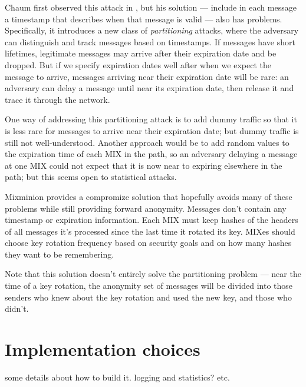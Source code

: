 \documentclass{llncs}
\begin{document}
Chaum first observed this attack in \cite{chaum-mix}, but his solution
--- include in each message a timestamp that describes when that message
is valid --- also has problems. Specifically, it introduces a new class
of \emph{partitioning} attacks, where the adversary can distinguish and
track messages based on timestamps. If messages have short lifetimes,
legitimate messages may arrive after their expiration date and be
dropped. But if we specify expiration dates well after when we expect the
message to arrive, messages arriving near their expiration date will be
rare: an adversary can delay a message until near its expiration date,
then release it and trace it through the network.


One way of addressing this partitioning attack is to add dummy traffic
so that it is less rare for messages to arrive near their expiration date;
but dummy traffic is still not well-understood. Another approach would
be to add random values to the expiration time of each MIX in the path,
so an adversary delaying a message at one MIX could not expect that it
is now near to expiring elsewhere in the path; but this seems open to
statistical attacks.

Mixminion provides a compromize solution that hopefully avoids many of
these problems while still providing forward anonymity. Messages don't
contain any timestamp or expiration information. Each MIX must keep
hashes of the headers of all messages it's processed since the last time
it rotated its key. MIXes should choose key rotation frequency based on
security goals and on how many hashes they want to be remembering.

Note that this solution doesn't entirely solve the partitioning problem
--- near the time of a key rotation, the anonymity set of messages will
be divided into those senders who knew about the key rotation and used
the new key, and those who didn't.


\section{Implementation choices}
\label{sec:implementation}

some details about how to build it. logging and statistics? etc.
\end{document}
